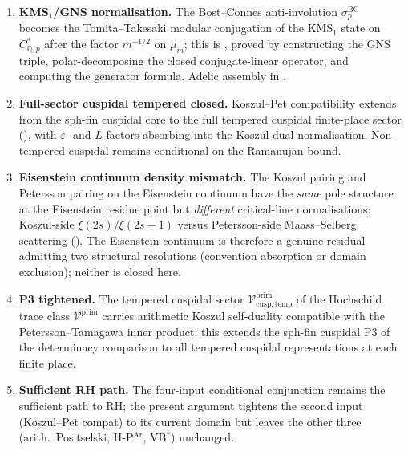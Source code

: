 \begin{enumerate}
\item \textbf{KMS\({}_{1}\)/GNS normalisation.} The Bost--Connes
anti-involution \(\sigma^{\mathrm{BC}}_{p}\) becomes the
Tomita--Takesaki modular conjugation of the KMS\({}_{1}\) state on
\(C^{*}_{\mathbb{Q},p}\) after the factor \(m^{-1/2}\) on \(\mu_m\);
this is
, proved by
constructing the GNS triple, polar-decomposing the closed
conjugate-linear operator, and computing the generator formula.
Adelic assembly in
.

\item \textbf{Full-sector cuspidal tempered closed.} Koszul--Pet
compatibility extends from the sph-fin cuspidal core to the
full tempered cuspidal finite-place sector
(),
with \(\varepsilon\)- and \(L\)-factors absorbing into the Koszul-dual
normalisation. Non-tempered cuspidal remains conditional on the
Ramanujan bound.

\item \textbf{Eisenstein continuum density mismatch.} The
Koszul pairing and Petersson pairing on the Eisenstein continuum
have the \emph{same} pole structure at the Eisenstein residue point
but \emph{different} critical-line normalisations: Koszul-side
\(\xi(2s)/\xi(2s-1)\) versus Petersson-side Maass--Selberg scattering
().
The Eisenstein continuum is therefore a genuine residual admitting
two structural resolutions (convention absorption or domain
exclusion); neither is closed here.

\item \textbf{P3 tightened.}
The tempered cuspidal sector
\(\mathcal{V}^{\mathrm{prim}}_{\mathrm{cusp,temp}}\) of the
Hochschild trace class \(\mathcal{V}^{\mathrm{prim}}\) carries
arithmetic Koszul self-duality compatible with the
Petersson--Tamagawa inner product; this extends the sph-fin
cuspidal P3 of the determinacy comparison to all tempered cuspidal representations
at each finite place.

\item \textbf{Sufficient RH path.} The four-input conditional conjunction
 remains the
sufficient path to RH; the present argument tightens the second input
(Koszul--Pet compat) to its current domain but leaves the other
three (arith.~Positselski, H-P\(^{\mathrm{Ar}}\), VB\(^{*}\)) unchanged.


\end{enumerate}
